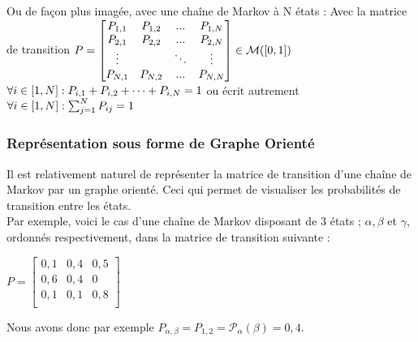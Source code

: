 \documentclass{article}
\begin{document}
Ou de façon plus imagée, avec une chaîne de Markov à N états :  
Avec la matrice de transition 
$
P = \begin{bmatrix}
P_{1,1} & P_{1,2} & ... & P_{1,N}\\
P_{2,1} & P_{2,2} & ... & P_{2,N}\\
\vdots & &\ddots & \vdots\\
P_{N,1} & P_{N,2} & ... & P_{N, N}\\
\end{bmatrix} \in \mathcal{M}([0,1]) \\$
$\forall i \in [1,N] : P_{i,1} + P_{i,2} + \dots + P_{i, N} = 1 \space \\$
ou écrit autrement  
$\forall i \in [1,N]: \sum_{j = 1}^N P_{i j} = 1\\$ 

\subsubsection{Représentation sous forme de Graphe Orienté}
\label{subsubsec: Représentation sous forme de graphe orienté}

Il est relativement naturel de représenter la matrice de transition d'une chaîne de Markov par un graphe orienté.
Ceci qui permet de visualiser les probabilités de transition entre les états. \\

Par exemple, voici le cas d'une chaîne de Markov disposant de 3 états ; $\alpha, \beta$ et $\gamma $, ordonnés respectivement, dans la matrice de transition suivante :
\begin{center}
$
P = \begin{bmatrix}
0,1 & 0,4 & 0,5 \\
0,6 & 0,4 & 0   \\
0,1 & 0,1 & 0,8 \\
\end{bmatrix}
$
\end{center}
Nous avons donc par exemple $ P_{\alpha,\beta} = P_{1,2} = \mathcal{P}_\alpha(\beta) = 0,4$. \\

\end{document}
